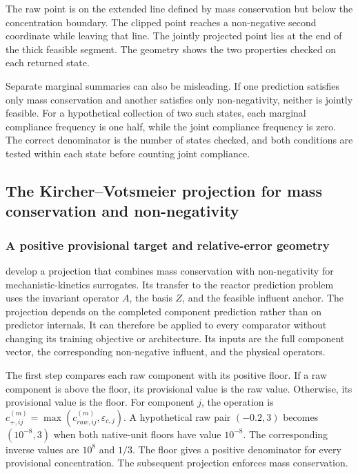The raw point is on the extended line defined by mass conservation but below the concentration boundary. The clipped point reaches a non-negative second coordinate while leaving that line. The jointly projected point lies at the end of the thick feasible segment. The geometry shows the two properties checked on each returned state.

Separate marginal summaries can also be misleading. If one prediction satisfies only mass conservation and another satisfies only non-negativity, neither is jointly feasible. For a hypothetical collection of two such states, each marginal compliance frequency is one half, while the joint compliance frequency is zero. The correct denominator is the number of states checked, and both conditions are tested within each state before counting joint compliance.

\subsection{The Kircher--Votsmeier projection for mass conservation and non-negativity}

\subsubsection{A positive provisional target and relative-error geometry}

\citet{KircherVotsmeier2025} develop a projection that combines mass conservation with non-negativity for mechanistic-kinetics surrogates. Its transfer to the reactor prediction problem uses the invariant operator $A$, the basis $Z$, and the feasible influent anchor. The projection depends on the completed component prediction rather than on predictor internals. It can therefore be applied to every comparator without changing its training objective or architecture. Its inputs are the full component vector, the corresponding non-negative influent, and the physical operators.

The first step compares each raw component with its positive floor. If a raw component is above the floor, its provisional value is the raw value. Otherwise, its provisional value is the floor. For component $j$, the operation is $c_{+,ij}^{(m)}=\max(c_{raw,ij}^{(m)},\varepsilon_{c,j})$. A hypothetical raw pair $(-0.2,3)$ becomes $(10^{-8},3)$ when both native-unit floors have value $10^{-8}$. The corresponding inverse values are $10^8$ and $1/3$. The floor gives a positive denominator for every provisional concentration. The subsequent projection enforces mass conservation.

